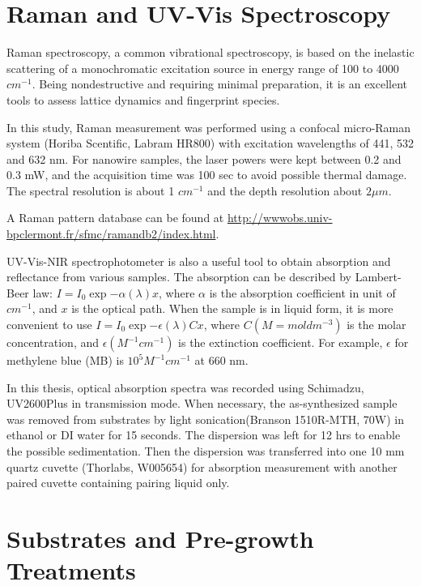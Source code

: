 \section{Raman and UV-Vis Spectroscopy}

Raman spectroscopy, a common vibrational spectroscopy, is based on the inelastic scattering of a monochromatic excitation source in energy range of 100 to 4000 $cm^{-1}$. Being nondestructive and requiring minimal preparation, 
it is an excellent tools to assess lattice dynamics and fingerprint species.\cite{McCreery2000} 

In this study, Raman measurement was performed using a confocal micro-Raman system (Horiba Scentific, Labram HR800) with excitation wavelengths of 441, 532 and 632 nm. For nanowire samples, the laser powers were kept between 0.2 and 0.3 mW, and the acquisition time was 100 sec to avoid possible thermal damage. The spectral resolution is about 1 $cm^{-1}$ and the depth resolution about $2\mu m$.  

A Raman pattern database can be found at \url{http://wwwobs.univ-bpclermont.fr/sfmc/ramandb2/index.html}. 

UV-Vis-NIR spectrophotometer is also a useful tool to obtain absorption and reflectance from various samples. The absorption can be described by Lambert-Beer law: $I = I_0 \exp{-\alpha(\lambda) x}$, where $\alpha$ is the absorption coefficient in unit of $cm^{-1}$, and $x$ is the optical path. When the sample is in liquid form, it is more convenient to use $I = I_0 \exp{-\epsilon(\lambda) C x}$, where $C(M = mol dm^{-3})$ is the molar concentration, and $\epsilon (M^{-1}cm^{-1})$ is the extinction coefficient. For example, $\epsilon$ for methylene blue (MB) is $10^5 M^{-1}cm^{-1}$ at 660 nm.\cite{Mills1999}

In this thesis, optical absorption spectra was recorded using Schimadzu, UV2600Plus in transmission mode. When necessary, the as-synthesized sample was removed from substrates by light sonication(Branson 1510R-MTH, 70W) in ethanol or DI water for 15 seconds. The dispersion was left for 12 hrs to enable the possible sedimentation. Then the dispersion was transferred into one 10 mm quartz cuvette (Thorlabs, W005654) for absorption measurement with another paired cuvette containing pairing liquid only. 


\section{Substrates and Pre-growth Treatments}

